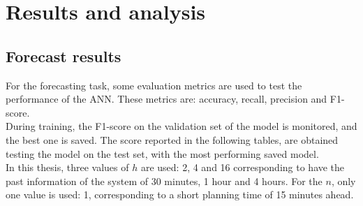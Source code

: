 
\section{Results and analysis}
\subsection{Forecast results}
For the forecasting task, some evaluation metrics are used to test the performance of the \gls{ANN}. These metrics are: accuracy, recall, precision and F1-score. \\
During training, the F1-score on the validation set of the model is monitored, and the best one is saved. The score reported in the following tables, are obtained testing the model on the test set, with the most performing saved model. \\

In this thesis, three values of $h$ are used: 2, 4 and 16 corresponding to have the past information of the system of 30 minutes, 1 hour and 4 hours. For the $n$, only one value is used: 1, corresponding to a short planning time of 15 minutes ahead.\\

